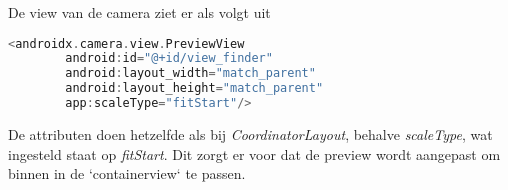 De view van de camera ziet er als volgt uit
\begin{lstlisting}[language=Kotlin, caption=CameraView]
    <androidx.camera.view.PreviewView
        android:id="@+id/view_finder"
        android:layout_width="match_parent"
        android:layout_height="match_parent"
        app:scaleType="fitStart"/>
\end{lstlisting}
De attributen doen hetzelfde als bij \emph{CoordinatorLayout}, behalve \emph{scaleType}, wat ingesteld staat op \emph{fitStart}. Dit zorgt er voor dat de preview wordt aangepast om binnen in de `containerview` te passen.




